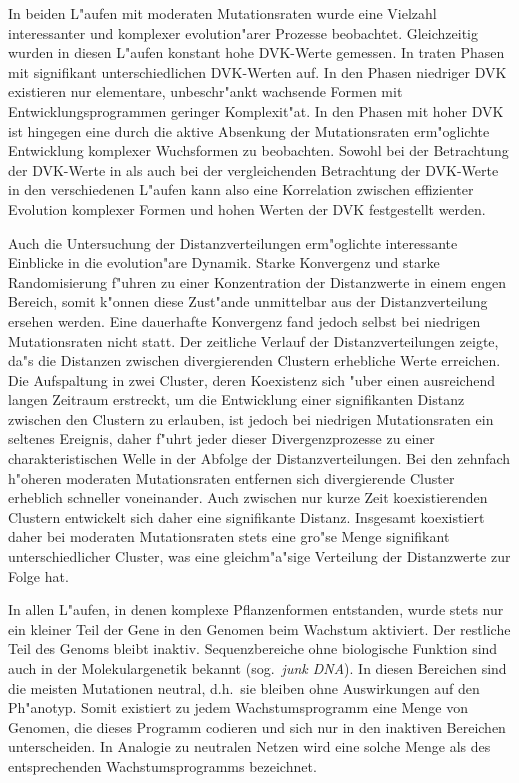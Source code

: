 In beiden L"aufen mit moderaten Mutationsraten
wurde eine Vielzahl interessanter und komplexer evolution"arer Prozesse beobachtet. Gleichzeitig
wurden in diesen L"aufen konstant hohe DVK-Werte gemessen. In  traten Phasen mit
signifikant unterschiedlichen DVK-Werten auf. In den Phasen niedriger DVK existieren nur elementare,
unbeschr"ankt wachsende Formen mit Entwicklungsprogrammen geringer Komplexit"at. In den Phasen mit
hoher DVK ist hingegen eine durch die aktive Absenkung der Mutationsraten erm"oglichte
Entwicklung komplexer Wuchsformen zu beobachten. Sowohl bei der Betrachtung der DVK-Werte in
 als auch bei der vergleichenden Betrachtung der DVK-Werte in den verschiedenen
L"aufen kann also eine Korrelation zwischen effizienter Evolution komplexer Formen und hohen Werten
der DVK festgestellt werden.

Auch die Untersuchung der Distanzverteilungen erm"oglichte interessante Einblicke in die
evolution"are Dynamik. Starke Konvergenz und starke Randomisierung f"uhren zu einer Konzentration
der Distanzwerte in einem engen Bereich, somit k"onnen diese Zust"ande unmittelbar aus der
Distanzverteilung ersehen werden. Eine dauerhafte Konvergenz fand jedoch selbst bei niedrigen
Mutationsraten nicht statt. Der zeitliche Verlauf der Distanzverteilungen zeigte, da"s die
Distanzen zwischen divergierenden Clustern erhebliche Werte erreichen. Die Aufspaltung in zwei
Cluster, deren Koexistenz sich "uber einen ausreichend langen Zeitraum erstreckt, um die Entwicklung
einer signifikanten Distanz zwischen den Clustern zu erlauben, ist jedoch bei niedrigen
Mutationsraten ein seltenes Ereignis, daher f"uhrt jeder dieser Divergenzprozesse zu einer
charakteristischen Welle in der Abfolge der Distanzverteilungen. Bei den zehnfach h"oheren
moderaten Mutationsraten entfernen sich divergierende Cluster erheblich schneller voneinander.
Auch zwischen nur kurze Zeit koexistierenden Clustern entwickelt sich daher eine signifikante
Distanz. Insgesamt koexistiert daher bei moderaten Mutationsraten stets eine gro"se Menge
signifikant unterschiedlicher Cluster, was eine gleichm"a"sige Verteilung der Distanzwerte
zur Folge hat.

In allen L"aufen, in denen komplexe Pflanzenformen entstanden, wurde stets nur ein kleiner Teil der
Gene in den Genomen beim Wachstum aktiviert. Der restliche Teil des Genoms bleibt inaktiv. Sequenzbereiche
ohne biologische Funktion sind auch in der Molekulargenetik bekannt (sog.\ {\slshape junk DNA}). In diesen
Bereichen sind die meisten Mutationen neutral, d.h.\ sie bleiben ohne Auswirkungen auf den Ph"anotyp.
Somit existiert zu jedem Wachstumsprogramm eine Menge von Genomen, die dieses Programm codieren
und sich nur in den inaktiven Bereichen unterscheiden. In Analogie zu neutralen Netzen \cite{Forst95} wird eine solche
Menge als  des entsprechenden Wachstumsprogramms bezeichnet.

